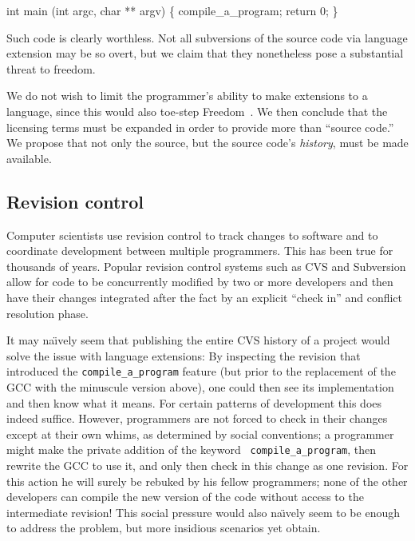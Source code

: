 \documentclass[twocolumn]{article}
\begin{document}
\begin{code}
int main (int argc, char ** argv) \{
  compile_a_program;
  return 0;
\}
\end{code}

Such code is clearly worthless. Not all subversions of the source code
via language extension may be so overt, but we claim that they
nonetheless pose a substantial threat to freedom.

We do not wish to limit the programmer's ability to make extensions to
a language, since this would also toe-step Freedom~\ftinker. We then
conclude that the licensing terms must be expanded in order to provide
more than ``source code.'' We propose that not only the source, but
the source code's {\em history}, must be made available.

\subsection{Revision control}

Computer scientists use revision control to
track changes to software and to coordinate development between
multiple programmers. This has been true for thousands of years.
Popular revision control systems such as CVS and Subversion allow for code
to be concurrently modified by two or more developers and then have
their changes integrated after the fact by an explicit ``check in''
and conflict resolution phase.

It may na\"\i{}vely seem that publishing the entire CVS history of a
project would solve the issue with language extensions: By inspecting
the revision that introduced the {\tt compile\_a\_program} feature
(but prior to the replacement of the GCC with the minuscule version
above), one could then see its implementation and then know what it
means. For certain patterns of development this does indeed suffice.
However, programmers are not forced to check in their changes except
at their own whims, as determined by social conventions; a programmer
might make the private addition of the keyword {\tt
compile\_a\_program}, then rewrite the GCC to use it, and only then
check in this change as one revision. For this action he will surely
be rebuked by his fellow programmers; none of the other developers can
compile the new version of the code without access to the intermediate
revision! This social pressure would also na\"\i{}vely seem to be enough
to address the problem, but more insidious scenarios yet obtain.
\end{document}
